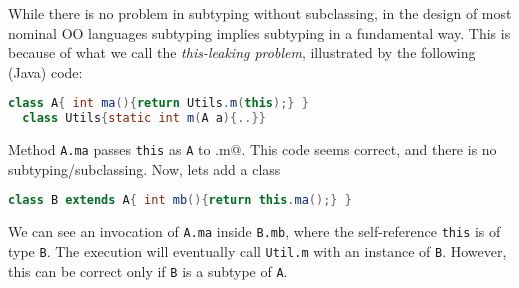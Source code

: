 While there is no problem in subtyping without subclassing, in the design
of most nominal OO languages subtyping implies subtyping in a
fundamental way. This is because of what we call the
\emph{this-leaking problem}, illustrated by the following
(Java) code:

\begin{lstlisting}[language=Java]
  class A{ int ma(){return Utils.m(this);} }
  class Utils{static int m(A a){..}}
\end{lstlisting}

Method \lstinline{A.ma} passes \lstinline{this} as \lstinline{A} to \Q@Util.m@.
This code seems correct, and there is no subtyping/subclassing.  Now, lets add a class \Q@B@

\begin{lstlisting}[language=Java]
  class B extends A{ int mb(){return this.ma();} }  
\end{lstlisting}

We can see an invocation of \lstinline{A.ma} inside
\lstinline{B.mb}, where the self-reference \lstinline{this} is of type \lstinline{B}. 
The execution will eventually call \lstinline{Util.m} with an
instance of \lstinline{B}. However, this can be correct only if \lstinline{B} is a subtype of
\lstinline{A}. 

%
%


